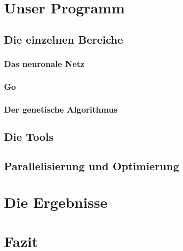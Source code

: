 \documentclass[12pt,a4paper]{article}
\begin{document}
\section{Unser Programm}

\subsection{Die einzelnen Bereiche}

\subsubsection{Das neuronale Netz}
\subsubsection{Go}
\subsubsection{Der genetische Algorithmus}

\subsection{Die Tools}

\subsection{Parallelisierung und Optimierung}

\section{Die Ergebnisse}

\section{Fazit}
\end{document}
